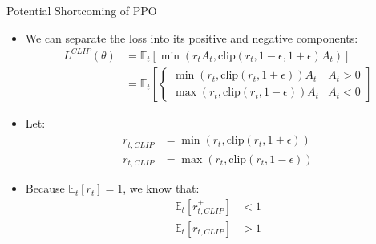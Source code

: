 \documentclass{beamer}
\begin{document}
\begin{frame}{Potential Shortcoming of PPO}
    \begin{itemize}
        \item We can separate the loss into its positive and negative
            components:
        \begin{align*}
            L^{CLIP}(\theta) &= \mathbb{E}_t\left[ 
            \min\left(r_tA_t, \text{clip}
            (r_t, 1 - \epsilon, 1 + \epsilon)A_t\right)\right]\\
            &= \mathbb{E}_t\left[ 
            \begin{cases}
                \min\left(r_t, \text{clip}
                (r_t, 1 + \epsilon)\right)A_t & A_t > 0\\
                \max\left(r_t, \text{clip}
                (r_t, 1 - \epsilon)\right)A_t & A_t < 0
            \end{cases}\right]
        \end{align*}
        \item Let:
        \begin{align*}
            r_{t, CLIP}^+ &= 
            \min\left(r_t, \text{clip}
            (r_t, 1 + \epsilon)\right)\\
            r_{t, CLIP}^- &= 
            \max\left(r_t, \text{clip}
            (r_t, 1 - \epsilon)\right)
        \end{align*}
        \item Because $\mathbb{E}_t[r_t] = 1$, we know that:
        \begin{align*}
            \mathbb{E}_t[r_{t, CLIP}^+] &< 1\\
            \mathbb{E}_t[r_{t, CLIP}^-] &> 1\\
        \end{align*}\\


\end{itemize}
\end{frame}
\end{document}
